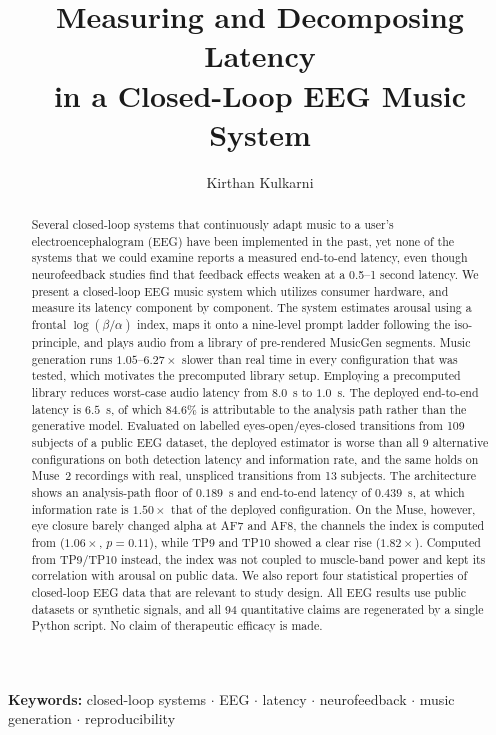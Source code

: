 \documentclass[11pt,a4paper]{article}
\title{Measuring and Decomposing Latency\\
       in a Closed-Loop EEG Music System}
\author{Kirthan Kulkarni}
\date{}
\begin{document}
\maketitle

\begin{abstract}
Several closed-loop systems that continuously adapt music to a user's electroencephalogram
(EEG) have been implemented in the past, yet none of the systems that we could examine
reports a measured end-to-end latency, even though neurofeedback studies find that feedback
effects weaken at a 0.5--1 second latency. We present a closed-loop EEG music system which
utilizes consumer hardware, and measure its latency component by component. The system
estimates arousal using a frontal $\log(\beta/\alpha)$ index, maps it onto a nine-level
prompt ladder following the iso-principle, and plays audio from a library of pre-rendered
MusicGen segments. Music generation runs $1.05$--$6.27\times$ slower than real time in
every configuration that was tested, which motivates the precomputed library setup.
Employing a precomputed library reduces worst-case audio latency from $8.0$~s to $1.0$~s.
The deployed end-to-end latency is $6.5$~s, of which $84.6\%$ is attributable to the
analysis path rather than the generative model. Evaluated on labelled eyes-open/eyes-closed
transitions from 109 subjects of a public EEG dataset, the deployed estimator is worse than
all 9 alternative configurations on both detection latency and information rate, and the
same holds on Muse~2 recordings with real, unspliced transitions from 13 subjects. The
architecture shows an analysis-path floor of $0.189$~s and end-to-end latency of $0.439$~s,
at which information rate is $1.50\times$ that of the deployed configuration. On the Muse,
however, eye closure barely changed alpha at AF7 and AF8, the channels the index is computed
from ($1.06\times$, $p = 0.11$), while TP9 and TP10 showed a clear rise ($1.82\times$).
Computed from TP9/TP10 instead, the index was not coupled to muscle-band power and kept its
correlation with arousal on public data. We also report four statistical properties of
closed-loop EEG data that are relevant to study design. All EEG results use public datasets or synthetic signals, and all 94 quantitative claims are
regenerated by a single Python script. No claim of therapeutic efficacy is made.
\end{abstract}

\noindent\textbf{Keywords:} closed-loop systems $\cdot$ EEG $\cdot$ latency $\cdot$
neurofeedback $\cdot$ music generation $\cdot$ reproducibility
\end{document}
